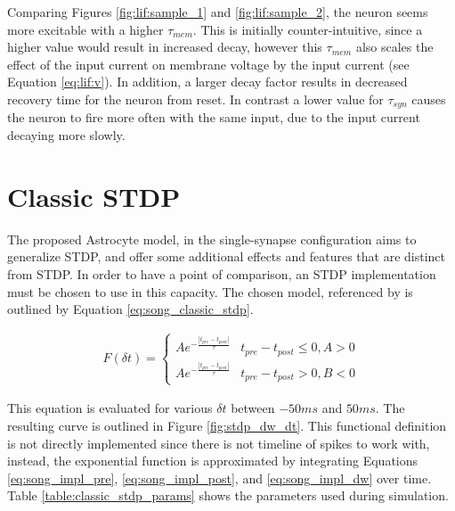 


Comparing Figures \ref{fig:lif:sample_1} and \ref{fig:lif:sample_2}, the
neuron seems more excitable with a higher $\tau_{mem}$. This is initially
counter-intuitive, since a higher value would result in increased decay,
however this $\tau_{mem}$ also scales the effect of the input current on
membrane voltage by the input current (see Equation \ref{eq:lif:v}). In
addition, a larger decay factor results in decreased recovery time for the
neuron from reset. In contrast a lower value for $\tau_{syn}$ causes the
neuron to fire more often with the same input, due to the input current
decaying more slowly.

\section{Classic STDP} \label{obj1:sec:classic_stdp}
    
The proposed Astrocyte model, in the single-synapse configuration aims to
generalize STDP, and offer some additional effects and features that are
distinct from STDP. In order to have a point of comparison, an STDP
implementation must be chosen to use in this capacity. The chosen model,
referenced by \parencite{song_2000} is outlined by Equation
\ref{eq:song_classic_stdp}.

\begin{align}
  F(\delta t) =
  \begin{cases} 
    Ae^{- \frac{|t_{pre}-t_{post}|}{\tau}} & t_{pre} - t_{post} \leq 0, A > 0
    \\ Ae^{- \frac{|t_{pre}-t_{post}|}{\tau}} & t_{pre} - t_{post} > 0, B < 0
  \end{cases} \label{eq:song_classic_stdp}
\end{align}

This equation is evaluated for various $\delta t$ between $-50ms$ and
$50ms$. The resulting curve is outlined in Figure \ref{fig:stdp_dw_dt}. This
functional definition is not directly implemented since there is not timeline of
spikes to work with, instead, the exponential function is approximated by
integrating Equations \ref{eq:song_impl_pre}, \ref{eq:song_impl_post}, and
\ref{eq:song_impl_dw} over time. Table \ref{table:classic_stdp_params} shows the
parameters used during simulation.

